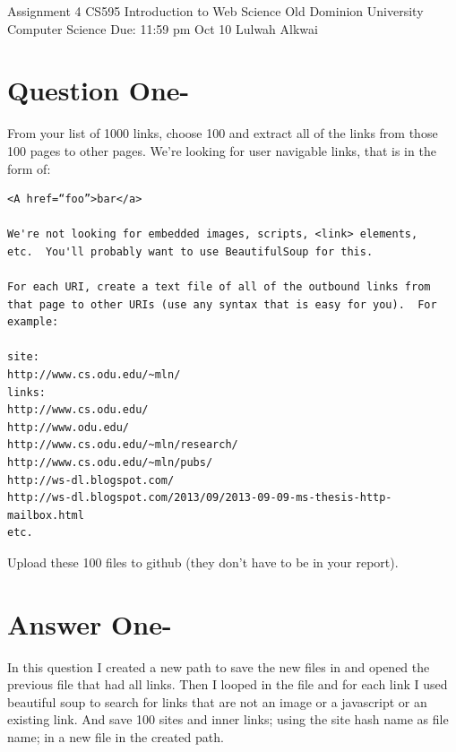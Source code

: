 \documentclass[letterpaper,11pt]{article}
\begin{document}
\begin{titlepage}
\begin{center}


\Huge{Assignment 4}
\newline
\Large{CS595}
\newline
\Large{Introduction to Web Science}
\newline
\Large{Old Dominion University}
\newline
\Large{Computer Science}
\newline
\Large{Due: 11:59 pm Oct 10}
\newline
\Large{Lulwah Alkwai}
\newline
\end{center}
\end{titlepage}
\newpage


\section*{ Question One-}

From your list of 1000 links, choose 100 and extract all of the links from those 100 pages to other pages.  We're looking for user navigable links, that is in the form of: 

\begin{verbatim}
<A href=“foo”>bar</a>

We're not looking for embedded images, scripts, <link> elements,
etc.  You'll probably want to use BeautifulSoup for this.

For each URI, create a text file of all of the outbound links from
that page to other URIs (use any syntax that is easy for you).  For
example:

site: 
http://www.cs.odu.edu/~mln/    
links:
http://www.cs.odu.edu/
http://www.odu.edu/
http://www.cs.odu.edu/~mln/research/
http://www.cs.odu.edu/~mln/pubs/
http://ws-dl.blogspot.com/
http://ws-dl.blogspot.com/2013/09/2013-09-09-ms-thesis-http-mailbox.html
etc.
\end{verbatim}
Upload these 100 files to github (they don't have to be in your report). 
\pagebreak

\section*{Answer One-}
In this question I created a new path to save the new files in and opened the previous file that had all links. Then I looped in the file and for each link I used beautiful soup to search for links that are not an image or a javascript or an existing link. And save 100 sites and inner links; using the site hash name as file name; in a new file in the created path.
\end{document}
